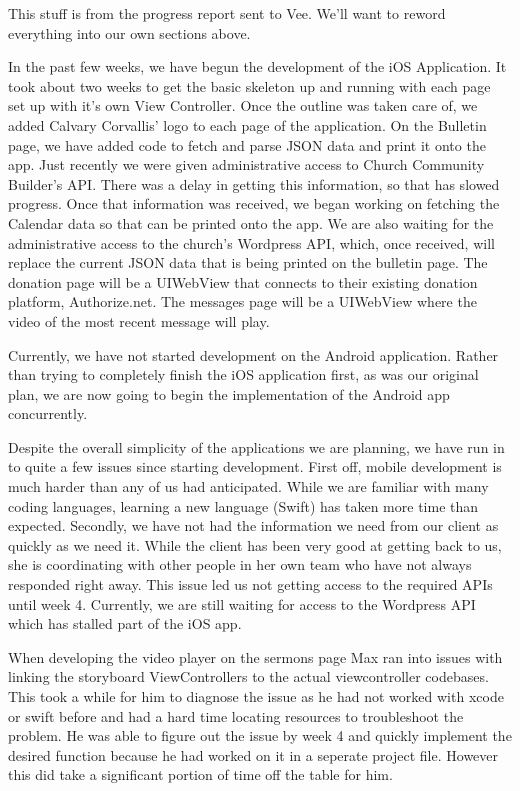 \documentclass[letterpaper,10pt,draftclsnofoot,onecolumn,titlepage]{IEEEtran}
\begin{document}
	This stuff is from the progress report sent to Vee. We'll want to reword everything into our own sections above.

		In the past few weeks, we have begun the development of the iOS Application.
		It took about two weeks to get the basic skeleton up and running with each page set up with it's own View Controller.
		Once the outline was taken care of, we added Calvary Corvallis' logo to each page of the application.
		On the Bulletin page, we have added code to fetch and parse JSON data and print it onto the app.
		Just recently we were given administrative access to Church Community Builder's API.
		There was a delay in getting this information, so that has slowed progress.
		Once that information was received, we began working on fetching the Calendar data so that can be printed onto the app.
		We are also waiting for the administrative access to the church's Wordpress API, which, once received, will replace the current JSON data that is being printed on the bulletin page.
		The donation page will be a UIWebView that connects to their existing donation platform, Authorize.net.
		The messages page will be a UIWebView where the video of the most recent message will play.

		Currently, we have not started development on the Android application.
		Rather than trying to completely finish the iOS application first, as was our original plan, we are now going to begin the implementation of the Android app concurrently.

		Despite the overall simplicity of the applications we are planning, we have run in to quite a few issues since starting development.
		First off, mobile development is much harder than any of us had anticipated.
		While we are familiar with many coding languages, learning a new language (Swift) has taken more time than expected.
		Secondly, we have not had the information we need from our client as quickly as we need it.
		While the client has been very good at getting back to us, she is coordinating with other people in her own team who have not always responded right away.
		This issue led us not getting access to the required APIs until week 4.
		Currently, we are still waiting for access to the Wordpress API which has stalled part of the iOS app.

		When developing the video player on the sermons page Max ran into issues with linking the storyboard ViewControllers to the actual viewcontroller codebases.
		This took a while for him to diagnose the issue as he had not worked with xcode or swift before and had a hard time locating resources to troubleshoot the problem.
		He was able to figure out the issue by week 4 and quickly implement the desired function because he had worked on it in a seperate project file.
		However this did take a significant portion of time off the table for him.
\end{document}
